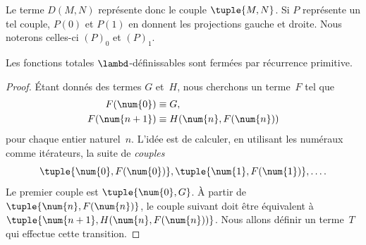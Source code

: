 \documentclass[../../../include/open-logic-section]{subfiles}
\begin{document}
Le terme $D(M,N)$ représente donc le couple
$\tuple{M,N}$. Si $P$ représente un tel couple,
$P(\num{0})$ et $P(\num{1})$ en donnent les
projections gauche et droite. Nous noterons
celles-ci $(P)_0$ et $(P)_1$.

\begin{lem}
Les fonctions totales $\lambd$-définissables sont
fermées par récurrence primitive.
\end{lem}

\begin{proof}
Étant donnés des termes $G$ et~$H$, nous cherchons
un terme~$F$ tel que
\begin{align*}
F(\num{0}) & \equiv G, \\
F(\num{n+1}) & \equiv H(\num{n},F(\num{n}))
\end{align*}
pour chaque entier naturel~$n$. L'idée est de
calculer, en utilisant les numéraux comme
itérateurs, la suite de \emph{couples}
\[
\tuple{\num{0},F(\num{0})},
\tuple{\num{1},F(\num{1})},\dots.
\]
Le premier couple est $\tuple{\num{0},G}$.
À partir de $\tuple{\num{n},F(\num{n})}$,
le couple suivant doit être équivalent à
$\tuple{\num{n+1},H(\num{n},F(\num{n}))}$.
Nous allons définir un terme~$T$ qui effectue
cette transition.


\end{proof}
\end{document}
